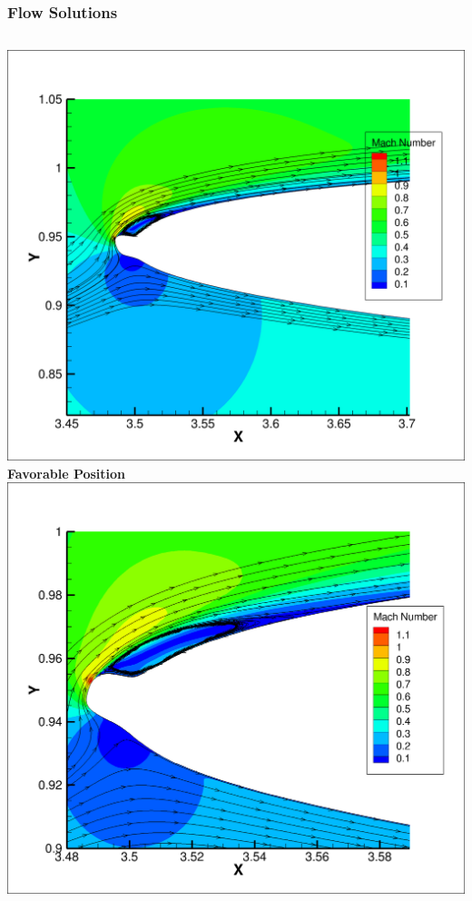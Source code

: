 \documentclass[9pt]{beamer}
\begin{document}
\begin{frame}
\frametitle{Flow Solutions}
\label{sec-3-10}


\begin{columns}[c]
    \centering
    \includegraphics[width=1\textwidth]{GoodHorn.png} \\
    {\bf Favorable Position}
    \includegraphics[width=1\textwidth]{GoodHornPOD.png} \\

\end{columns}
\end{frame}
\end{document}
